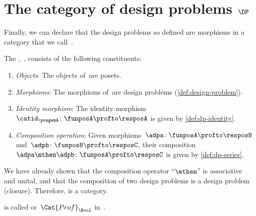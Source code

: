 
\section{The category of design problems $\DP$}

Finally, we can declare that the design problems so defined are morphisms in a category that we call~\iindex{\DP}.


\begin{definition}
    \label{def:DP}
    The \emph{,~\DP}, consists of the following constituents:
    \begin{enumerate}
        \item \emph{Objects}: The objects of~\DP are posets.
        \item \emph{Morphisms}: The morphisms of~\DP are design problems (\cref{def:design-problem}).
        \item \emph{Identity morphism}: The identity morphism~$\catid_\posgenA \colon \funposA \profto \resposA$ is given by \cref{def:dp-identity}.
        \item \emph{Composition operation}: Given morphisms~$\adpa \colon  \funposA \profto \resposB$ and~$\adpb \colon \funposB \profto \resposC$, their composition~$\adpa \mthen \adpb\colon \funposA\profto \resposC$ is given by \cref{def:dp-series}.
    \end{enumerate}
\end{definition}

We have already shown that the composition operator ``$\mthen$'' is associative and unital, and that the composition of two design problems is a design problem (closure).
Therefore, \DP is a category.

\begin{remark}
    \DP is called \feas or~$\Cat{Prof}_\Bool$ in~\cite{fong2019}.
\end{remark}

